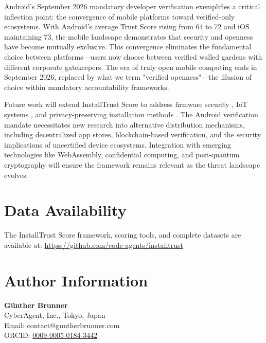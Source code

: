 \documentclass[11pt,a4paper]{article}
\begin{document}
Android's September 2026 mandatory developer verification \cite{google2025android} exemplifies a critical inflection point: the convergence of mobile platforms toward verified-only ecosystems. With Android's average Trust Score rising from 64 to 72 and iOS maintaining 73, the mobile landscape demonstrates that security and openness have become mutually exclusive. This convergence eliminates the fundamental choice between platforms—users now choose between verified walled gardens with different corporate gatekeepers. The era of truly open mobile computing ends in September 2026, replaced by what we term "verified openness"—the illusion of choice within mandatory accountability frameworks.

Future work will extend InstallTrust Score to address firmware security \cite{nist2024firmware}, IoT systems \cite{kumar2024iot}, and privacy-preserving installation methods \cite{gdpr2018,ccpa2020}. The Android verification mandate necessitates new research into alternative distribution mechanisms, including decentralized app stores, blockchain-based verification, and the security implications of uncertified device ecosystems. Integration with emerging technologies like WebAssembly, confidential computing, and post-quantum cryptography will ensure the framework remains relevant as the threat landscape evolves.

\section*{Data Availability}
The InstallTrust Score framework, scoring tools, and complete datasets are available at: \url{https://github.com/code-agents/installtrust}

\section*{Author Information}
\noindent \textbf{Günther Brunner} \\
CyberAgent, Inc., Tokyo, Japan \\
Email: contact@guntherbrunner.com \\
ORCID: \href{https://orcid.org/0009-0005-0184-3442}{0009-0005-0184-3442}




\appendix
\end{document}
